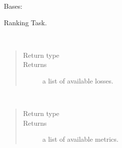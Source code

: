 \documentclass[letterpaper,10pt,english]{sphinxmanual}
\begin{document}
\begin{fulllineitems}
\label{\detokenize{matchzoo.tasks:matchzoo.tasks.ranking.Ranking}}
Bases: {\hyperref[\detokenize{matchzoo.engine:matchzoo.engine.base_task.BaseTask}]{}}

Ranking Task.

\begin{fulllineitems}
\label{\detokenize{matchzoo.tasks:matchzoo.tasks.ranking.Ranking.list_available_losses}}~\begin{quote}\begin{description}
\item[{Return type}] \leavevmode
{}

\item[{Returns}] \leavevmode
a list of available losses.

\end{description}\end{quote}

\end{fulllineitems}


\begin{fulllineitems}
\label{\detokenize{matchzoo.tasks:matchzoo.tasks.ranking.Ranking.list_available_metrics}}~\begin{quote}\begin{description}
\item[{Return type}] \leavevmode
{}

\item[{Returns}] \leavevmode
a list of available metrics.

\end{description}\end{quote}

\end{fulllineitems}


\end{fulllineitems}
\end{document}
